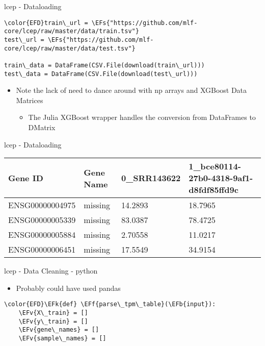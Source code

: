 \documentclass[bigger]{beamer}
\newcommand{\EFs}[1]{\textcolor{EFs}{#1}} %
\newcommand{\EFk}[1]{\textcolor{EFk}{#1}} %
\newcommand{\EFb}[1]{\textcolor{EFb}{#1}} %
\newcommand{\EFf}[1]{\textcolor{EFf}{#1}} %
\newcommand{\EFv}[1]{\textcolor{EFv}{#1}} %
\begin{document}
\begin{frame}[label={sec:orgfef0688},fragile]{lcep - Dataloading}
 \begin{Code}
\begin{Verbatim}
\color{EFD}train\_url = \EFs{"https://github.com/mlf-core/lcep/raw/master/data/train.tsv"}
test\_url = \EFs{"https://github.com/mlf-core/lcep/raw/master/data/test.tsv"}

train\_data = DataFrame(CSV.File(download(train\_url)))
test\_data = DataFrame(CSV.File(download(test\_url)))
\end{Verbatim}
\end{Code}

\begin{itemize}
\item Note the lack of need to dance around with np arrays and XGBoost Data Matrices
\begin{itemize}
\item The Julia XGBoost wrapper handles the conversion from DataFrames to DMatrix
\end{itemize}
\end{itemize}

\end{frame}
\begin{frame}[label={sec:org6bd1bd4}]{lcep - Dataloading}
\begin{center}
\small
\begin{tabular}{llll}
Gene ID & Gene Name & 0\_SRR143622 & 1\_bce80114-27b0-4318-9af1-d8fdf85ffd9c\\[0pt]
\hline
ENSG00000004975 & missing & 14.2893 & 18.7965\\[0pt]
ENSG00000005339 & missing & 83.0387 & 78.4725\\[0pt]
ENSG00000005884 & missing & 2.70558 & 11.0217\\[0pt]
ENSG00000006451 & missing & 17.5549 & 34.9154\\[0pt]
\end{tabular}
\end{center}
\end{frame}

\begin{frame}[label={sec:org3a88ead},fragile]{lcep - Data Cleaning - python}
 \begin{itemize}
\item Probably could have used pandas
\end{itemize}

\begin{Code}
\begin{Verbatim}
\color{EFD}\EFk{def} \EFf{parse\_tpm\_table}(\EFb{input}):
    \EFv{X\_train} = []
    \EFv{y\_train} = []
    \EFv{gene\_names} = []
    \EFv{sample\_names} = []
\end{Verbatim}
\end{Code}
\end{frame}
\end{document}
